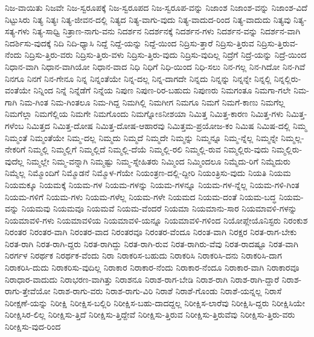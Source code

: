 {ನಿಜ-ವಾಯಿತು
ನಿಜವೇ
ನಿಜ-ಸ್ವರೂಪಕ್ಕೆ
ನಿಜ-ಸ್ವರೂಪದ
ನಿಜ-ಸ್ವರೂಪ-ವನ್ನು
ನಿಜಾಂಶ
ನಿಜಾಂಶ-ವನ್ನು
ನಿಜಾಂಶ-ವಿದೆ
ನಿಟ್ಟುಸಿರು
ನಿತ್ಯ
ನಿತ್ಯಃ
ನಿತ್ಯ-ಜೀವನ-ದಲ್ಲಿ
ನಿತ್ಯದ
ನಿತ್ಯ-ವಾಗು-ವುದು
ನಿತ್ಯ-ವಾದುದ-ರಿಂದ
ನಿತ್ಯ-ವಾದುದು
ನಿತ್ಯವು
ನಿತ್ಯ-ಸತ್ಯ-ಗಳು
ನಿತ್ಯ-ಸಾಧ್ವಿ
ನಿತ್ರಾಣ-ನಾಗು-ವನು
ನಿದರ್ಶನ
ನಿದರ್ಶನಕ್ಕೆ
ನಿದರ್ಶನ-ಗಳು
ನಿದರ್ಶನ-ವನ್ನು
ನಿದರ್ಶನ-ವಾಗಿ
ನಿದರ್ಶಿಸು-ವುದಕ್ಕೆ
ನಿದಿ
ನಿದಿ-ಧ್ಯಾಸಿ
ನಿದ್ದೆ
ನಿದ್ದೆ-ಯನ್ನು
ನಿದ್ದೆ-ಯಿಂದ
ನಿದ್ರಿಸು-ತ್ತಾರೆ
ನಿದ್ರಿಸು-ತ್ತಿರುವ
ನಿದ್ರಿಸು-ತ್ತಿರುವ-ನೆಂದು
ನಿದ್ರಿಸು-ತ್ತಿರು-ವರು
ನಿದ್ರಿಸು-ತ್ತಿರು-ವಳು
ನಿದ್ರಿಸು-ತ್ತಿರು-ವುದು
ನಿದ್ರಿಸು-ವುದಿಲ್ಲ
ನಿದ್ರೆಗೆ
ನಿದ್ರೆ-ಯನ್ನು
ನಿದ್ರೆ-ಯಿಂದ
ನಿಧಾನ-ವಾಗಿ
ನಿಧಾನ-ವಾಗಿಯೋ
ನಿಧಾನ-ವಾದ
ನಿಧಿ
ನಿಧಿಗೆ
ನಿಧಿ-ಯಿಂದ
ನಿಧಿ-ಸಲು
ನಿನ-ಗಲ್ಲ
ನಿನ-ಗಿದೋ
ನಿನ-ಗಿವೆ
ನಿನಗೂ
ನಿನಗೆ
ನಿನ-ಗೇನೂ
ನಿನ್ನ
ನಿನ್ನಂತೆಯೇ
ನಿನ್ನ-ದಲ್ಲ
ನಿನ್ನ-ದಾಗದೇ
ನಿನ್ನದು
ನಿನ್ನನ್ನು
ನಿನ್ನನ್ನೇ
ನಿನ್ನಲ್ಲಿ
ನಿನ್ನಲ್ಲಿರು-ವಂತೆಯೇ
ನಿನ್ನಿಂದ
ನಿನ್ನೆ
ನಿನ್ನೆಡೆಗೆ
ನಿನ್ನೆಯ
ನಿಪುಣ
ನಿಪುಣ-ರಿರ-ಬಹುದು
ನಿಪುಣರು
ನಿಮಗಂತೂ
ನಿಮಗಾ-ಗಲೇ
ನಿಮ-ಗಾಗಿ
ನಿಮ-ಗಿಂತ
ನಿಮ-ಗಿಂತಲೂ
ನಿಮ-ಗಿದ್ದ
ನಿಮಗಿಲ್ಲಿ
ನಿಮಗೀಗ
ನಿಮಗೂ
ನಿಮಗೆ
ನಿಮಗೆ-ಕಾಣು
ನಿಮಗೆಲ್ಲ
ನಿಮಗೆಲ್ಲಾ
ನಿಮಗೆಲ್ಲಿಯ
ನಿಮಗೇ
ನಿಮಗೊಂದು
ನಿಮಗ್ನೋಽನೀಶಯಾ
ನಿಮಿತ್ತ
ನಿಮಿತ್ತ-ಕಾರಣ
ನಿಮಿತ್ತ-ಗಳು
ನಿಮಿತ್ತ-ಗಳೆಂಬ
ನಿಮಿತ್ತದ
ನಿಮಿತ್ತ-ದೋಷ
ನಿಮಿತ್ತ-ದೋಷ-ಆಹಾರವು
ನಿಮಿತ್ತಮ-ಪ್ರಯೋಜ-ಕಂ
ನಿಮಿಷ
ನಿಮಿಷ-ದಲ್ಲಿ
ನಿಮ್ಮ
ನಿಮ್ಮಂತೆ
ನಿಮ್ಮಂತೆಯೇ
ನಿಮ್ಮ-ದಲ್ಲ
ನಿಮ್ಮದು
ನಿಮ್ಮದೆ
ನಿಮ್ಮದೇ
ನಿಮ್ಮನ್ನು
ನಿಮ್ಮನ್ನೂ
ನಿಮ್ಮ-ನ್ನೆಲ್ಲ
ನಿಮ್ಮನ್ನೇ
ನಿಮ್ಮಲ್ಲ-ನೇಕರಿಗೆ
ನಿಮ್ಮಲ್ಲಿ
ನಿಮ್ಮಲ್ಲಿಗೆ
ನಿಮ್ಮಲ್ಲಿದೆ
ನಿಮ್ಮಲ್ಲಿ-ದೆಯೆ
ನಿಮ್ಮಲ್ಲಿ-ರಲಿ
ನಿಮ್ಮಲ್ಲಿ-ರುವ
ನಿಮ್ಮಲ್ಲಿರು-ವುದು
ನಿಮ್ಮಲ್ಲಿರು-ವುದೆಲ್ಲ
ನಿಮ್ಮಲ್ಲೇ
ನಿಮ್ಮ-ವನ್ನಾಗಿ
ನಿಮ್ಮಷ್ಟು
ನಿಮ್ಮ-ಸ್ನೇಹಿತರು
ನಿಮ್ಮಿಂದ
ನಿಮ್ಮಿಂದಲೂ
ನಿಮ್ಮೆದು-ರಿಗೆ
ನಿಮ್ಮೆದುರು
ನಿಮ್ಮೆಲ್ಲ
ನಿಮ್ಮೊಂದಿಗೆ
ನಿಮ್ಮೊಡನೆ
ನಿಮ್ಮೊಳ-ಗೆಯೇ
ನಿಯಂತ್ರಣ-ದಲ್ಲಿ-ದ್ದೀರಿ
ನಿಯಂತ್ರಿಸು-ವುದು
ನಿಯತಿ
ನಿಯಮ
ನಿಯಮಕ್ಕೂ
ನಿಯಮಕ್ಕೆ
ನಿಯಮ-ಗಳ
ನಿಯಮ-ಗಳನ್ನು
ನಿಯಮ-ಗಳನ್ನೂ
ನಿಯಮ-ಗಳ-ನ್ನೆಲ್ಲ
ನಿಯಮ-ಗಳಿ-ಗಿಂತ
ನಿಯಮ-ಗಳಿಗೆ
ನಿಯಮ-ಗಳು
ನಿಯಮ-ಗಳೆಲ್ಲ
ನಿಯಮ-ಗಳೇ
ನಿಯಮದ
ನಿಯಮ-ದಂತೆ
ನಿಯಮ-ಬದ್ಧ
ನಿಯಮ-ವನ್ನು
ನಿಯಮವು
ನಿಯಮವೂ
ನಿಯಮವೆ
ನಿಯಮ-ವೆಂದರೆ
ನಿಯಮಾ
ನಿಯಮಾನು-ಸಾರ
ನಿಯಮಾವಳಿ-ಗಳನ್ನು
ನಿಯಮಾವಳಿ-ಗಳು
ನಿಯಮಾವಳಿಯ
ನಿಯಮಾವಳಿ-ಯನ್ನೂ
ನಿಯಮಾವಳಿ-ಗಳಿಂದ
ನಿಯೋಪ್ಲೇಯೊನಿಸ್ಟರು
ನಿರಂಕುಶ
ನಿರಂತರ
ನಿರಂತರ-ವಾಗಿ
ನಿರಂತರ-ವಾದ
ನಿರಂತರವೂ
ನಿರಂತರ-ವೆಂದೂ
ನಿರಂತ-ವಾಗಿ
ನಿರಕ್ಷರ
ನಿರತ-ರಾಗ-ಬೇಕು
ನಿರತ-ರಾಗಿ
ನಿರತ-ರಾಗಿ-ದ್ದರು
ನಿರತ-ರಾಗಿದ್ದು
ನಿರತ-ರಾಗಿ-ರುವ
ನಿರತ-ರಾಗಿರು-ವೆವು
ನಿರತ-ರಾದಷ್ಟೂ
ನಿರತ-ವಾಗಿ
ನಿರರ್ಗಳ
ನಿರರ್ಥಕ
ನಿರರ್ಥಕ-ವೆಂದು
ನಿರಾ
ನಿರಾಕರಿಸ-ಬಹುದು
ನಿರಾಕರಿಸಿ
ನಿರಾಕರಿಸಿ-ದನು
ನಿರಾಕರಿಸಿ-ದಾಗ
ನಿರಾಕರಿಸಿ-ದುದು
ನಿರಾಕರಿಸು-ವುದಿಲ್ಲ
ನಿರಾಕಾರ
ನಿರಾಕಾರ-ನೆಂದು
ನಿರಾಕಾರ-ನೆಂದೂ
ನಿರಾಕಾರ-ವಾಗಿ
ನಿರಾಕಾರವೂ
ನಿರಾಧಾರ-ವಾದುದು
ನಿರಾಭರಣ-ವಾಗಿತ್ತು
ನಿರಾಶನೂ
ನಿರಾಶ-ರಾಗ-ಬೇಡಿ
ನಿರಾಶ-ರಾಗಿ
ನಿರಾಶ-ರಾಗಿ-ದ್ದಾರೆ
ನಿರಾಶ-ರಾಗು-ತ್ತೇವೆಯೋ
ನಿರಾಶ-ರಾಗು-ವರು
ನಿರಾಶ-ರಾಗು-ವಿರಿ
ನಿರಾಶೆ
ನಿರಾಶೆ-ಗೊಂಡು
ನಿರಾಶೆ-ಯನ್ನಲ್ಲ
ನಿರಾಸೆ
ನಿರೀಕ್ಷಣೆ-ಯನ್ನು
ನಿರೀಕ್ಷಿ
ನಿರೀಕ್ಷಿಸ-ಬಲ್ಲಿರಿ
ನಿರೀಕ್ಷಿಸ-ಬಹು-ದಾದದ್ದಲ್ಲ
ನಿರೀಕ್ಷಿಸ-ಲಾರೆವು
ನಿರೀಕ್ಷಿಸಿ-ದ್ದರು
ನಿರೀಕ್ಷಿಸಿಯೇ
ನಿರೀಕ್ಷಿಸಿರ-ಲಿಲ್ಲ
ನಿರೀಕ್ಷಿಸು-ತ್ತಿದೆ
ನಿರೀಕ್ಷಿಸು-ತ್ತಿದ್ದೇವೆ
ನಿರೀಕ್ಷಿಸು-ತ್ತಿರುವ
ನಿರೀಕ್ಷಿಸು-ತ್ತಿರುವೆವು
ನಿರೀಕ್ಷಿಸು-ತ್ತಿರು-ವರು
ನಿರೀಕ್ಷಿಸು-ವುದ-ರಿಂದ
}
